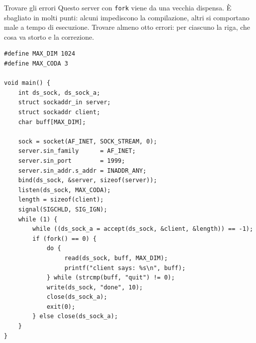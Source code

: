 \begin{esercizio}{Trovare gli errori}
Questo server con \texttt{fork} viene da una vecchia dispensa. È sbagliato in molti punti: alcuni impediscono la compilazione, altri si
comportano male a tempo di esecuzione. Trovare almeno otto errori: per ciascuno la riga, che cosa va storto e la correzione.
\begin{lstlisting}[language={[POSIX]C}, style=wnumbers]
#define MAX_DIM 1024
#define MAX_CODA 3

void main() {
    int ds_sock, ds_sock_a;
    struct sockaddr_in server;
    struct sockaddr client;
    char buff[MAX_DIM];

    sock = socket(AF_INET, SOCK_STREAM, 0);
    server.sin_family      = AF_INET;
    server.sin_port        = 1999;
    server.sin_addr.s_addr = INADDR_ANY;
    bind(ds_sock, &server, sizeof(server));
    listen(ds_sock, MAX_CODA);
    length = sizeof(client);
    signal(SIGCHLD, SIG_IGN);
    while (1) {
        while ((ds_sock_a = accept(ds_sock, &client, &length)) == -1);
        if (fork() == 0) {
            do {
                 read(ds_sock, buff, MAX_DIM);
                 printf("client says: %s\n", buff);
            } while (strcmp(buff, "quit") != 0);
            write(ds_sock, "done", 10);
            close(ds_sock_a);
            exit(0);
        } else close(ds_sock_a);
    }
}
\end{lstlisting}


\end{esercizio}

